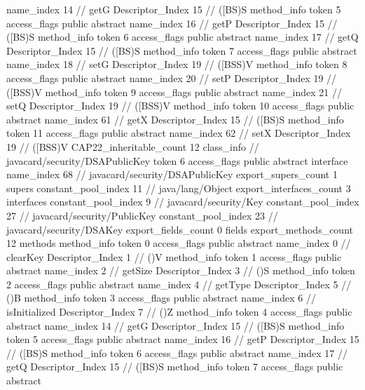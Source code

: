 {{{{{					name_index	14		// getG
					Descriptor_Index	15		// ([BS)S
				}
				method_info {
					token	5
					access_flags	public abstract
					name_index	16		// getP
					Descriptor_Index	15		// ([BS)S
				}
				method_info {
					token	6
					access_flags	public abstract
					name_index	17		// getQ
					Descriptor_Index	15		// ([BS)S
				}
				method_info {
					token	7
					access_flags	public abstract
					name_index	18		// setG
					Descriptor_Index	19		// ([BSS)V
				}
				method_info {
					token	8
					access_flags	public abstract
					name_index	20		// setP
					Descriptor_Index	19		// ([BSS)V
				}
				method_info {
					token	9
					access_flags	public abstract
					name_index	21		// setQ
					Descriptor_Index	19		// ([BSS)V
				}
				method_info {
					token	10
					access_flags	public abstract
					name_index	61		// getX
					Descriptor_Index	15		// ([BS)S
				}
				method_info {
					token	11
					access_flags	public abstract
					name_index	62		// setX
					Descriptor_Index	19		// ([BSS)V
				}
			}
			CAP22_inheritable_count	12
		}
		class_info {		// javacard/security/DSAPublicKey
			token	6
			access_flags	public abstract interface
			name_index	68		// javacard/security/DSAPublicKey
			export_supers_count	1
			supers {
				constant_pool_index	11		// java/lang/Object
			}
			export_interfaces_count	3
			interfaces {
				constant_pool_index	9		// javacard/security/Key
				constant_pool_index	27		// javacard/security/PublicKey
				constant_pool_index	23		// javacard/security/DSAKey
			}
			export_fields_count	0
			fields {
			}
			export_methods_count	12
			methods {
				method_info {
					token	0
					access_flags	public abstract
					name_index	0		// clearKey
					Descriptor_Index	1		// ()V
				}
				method_info {
					token	1
					access_flags	public abstract
					name_index	2		// getSize
					Descriptor_Index	3		// ()S
				}
				method_info {
					token	2
					access_flags	public abstract
					name_index	4		// getType
					Descriptor_Index	5		// ()B
				}
				method_info {
					token	3
					access_flags	public abstract
					name_index	6		// isInitialized
					Descriptor_Index	7		// ()Z
				}
				method_info {
					token	4
					access_flags	public abstract
					name_index	14		// getG
					Descriptor_Index	15		// ([BS)S
				}
				method_info {
					token	5
					access_flags	public abstract
					name_index	16		// getP
					Descriptor_Index	15		// ([BS)S
				}
				method_info {
					token	6
					access_flags	public abstract
					name_index	17		// getQ
					Descriptor_Index	15		// ([BS)S
				}
				method_info {
					token	7
					access_flags	public abstract
}}}}}
